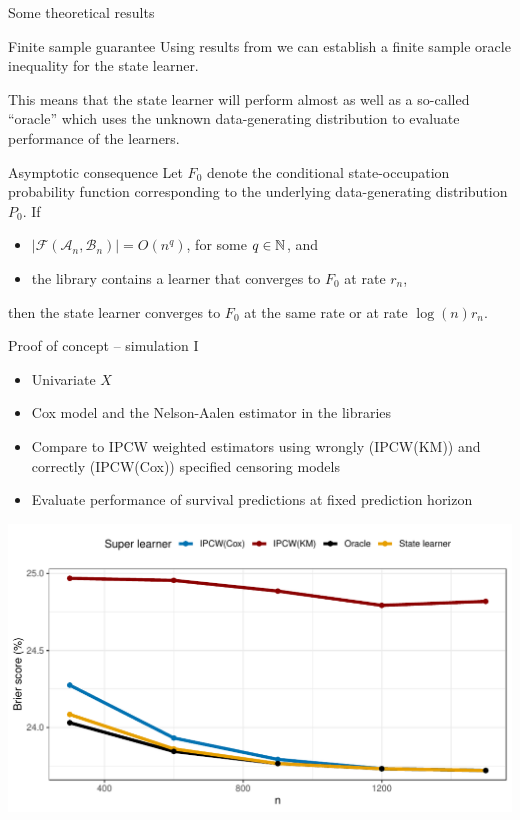 \documentclass[smaller]{beamer}\usepackage{listings}
\begin{document}
\begin{frame}[label={sec:orgbb63e1a}]{Some theoretical results}
\small

\begin{block}{Finite sample guarantee}
Using results from \citep{van2003unicv,van2006oracle} we can establish a finite
sample oracle inequality for the state learner.

\hfill

This means that the state learner will perform almost as well as a so-called
``oracle'' which uses the unknown data-generating distribution to evaluate
performance of the learners.

\hfill
\end{block}

\begin{block}{Asymptotic consequence}
Let \(F_0\) denote the conditional state-occupation probability function
corresponding to the underlying data-generating distribution \(P_0\). If

\begin{itemize}
\item \(|\mathcal{F}(\mathcal{A}_n,\mathcal{B}_n)| = O(n^q)\), for some \(q \in
  \mathbb{N}\), and
\item the library contains a learner that converges to \(F_0\) at rate \(r_n\),
\end{itemize}

then the state learner converges to \(F_0\) at the same rate or at rate \(\log(n) r_n\).
\end{block}
\end{frame}


\begin{frame}[label={sec:orgecc1b39}]{Proof of concept -- simulation I}
\small

\begin{itemize}
\item Univariate \(X\)
\item Cox model and the Nelson-Aalen estimator in the libraries
\item Compare to IPCW weighted estimators using wrongly (IPCW(KM)) and correctly
(IPCW(Cox)) specified censoring models
\item Evaluate performance of survival predictions at fixed prediction horizon
\end{itemize}

\begin{center}
\includegraphics[width=.9\textwidth]{./ipcw-fail.pdf}
\end{center}
\end{frame}
\end{document}

